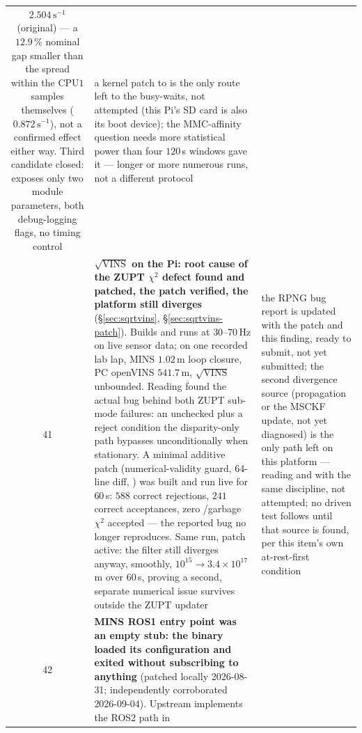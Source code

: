 \begin{longtable}{@{}cL{6.2cm}L{6.8cm}@{}}
    $2.504\,\mathrm{s}^{-1}$ (original) --- a $12.9\,\%$ nominal gap
    smaller than the spread within the CPU$1$ samples themselves
    ($0.872\,\mathrm{s}^{-1}$), not a confirmed effect either way. Third
    candidate closed:  exposes only two module
    parameters, both debug-logging flags, no timing control &
    a kernel patch to  is the only route left to the
     busy-waits, not attempted (this Pi's SD card is also
    its boot device); the MMC-affinity question needs more statistical
    power than four $120$\,s windows gave it --- longer or more numerous
    runs, not a different protocol \\
41 & \textbf{$\sqrt{\text{VINS}}$ on the Pi: root cause of the ZUPT
    $\chi^2$ defect found and patched, the patch verified, the platform
    still diverges} (\S\ref{sec:sqrtvins}, \S\ref{sec:sqrtvins-patch}).
    Builds and runs at $30$--$70\,\mathrm{Hz}$ on live sensor data; on
    one recorded lab lap, MINS $1.02$\,m loop closure, PC openVINS
    $541.7$\,m, $\sqrt{\text{VINS}}$ unbounded. Reading
     found the actual bug behind both
    ZUPT sub-mode failures: an unchecked  plus a
    reject condition the disparity-only path bypasses unconditionally
    when stationary. A minimal additive patch (numerical-validity guard,
    64-line diff, )
    was built and run live for $60$\,s: $588$ correct rejections, $241$
    correct acceptances, zero /garbage $\chi^2$ accepted ---
    the reported bug no longer reproduces. Same run, patch active: the
    filter still diverges anyway, smoothly, $10^{15}\to3.4{\times}10^{17}$\,m
    over $60$\,s, proving a second, separate numerical issue survives
    outside the ZUPT updater &
    the RPNG bug report is updated with the patch and this finding,
    ready to submit, not yet submitted; the second divergence source
    (propagation or the MSCKF update, not yet diagnosed) is the only
    path left on this platform --- reading  and
     with the same discipline, not attempted;
    no driven test follows until that source is found, per this
    item's own at-rest-first condition \\
42 & \textbf{MINS ROS1 entry point was an empty stub: the binary loaded its
    configuration and exited without subscribing to anything} (patched
    locally 2026-08-31; independently corroborated 2026-09-04).
    Upstream  implements the ROS2 path in

\end{longtable}
